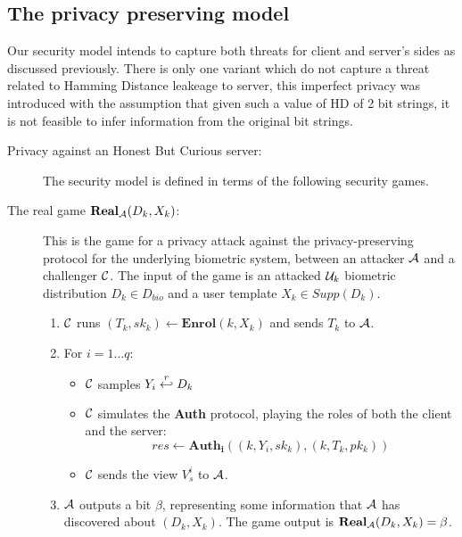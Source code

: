 \subsection{The privacy preserving model}
  Our security model intends to capture both threats for client and server's
  sides as discussed previously. There is only one variant which do not capture a
  threat related to Hamming Distance leakeage to server, this imperfect privacy
  was introduced with the assumption that given such a value of HD of 2 bit
  strings, it is not feasible to infer information from the original bit
  strings.
\begin{description}
\item[Privacy against an Honest But Curious server:] The security model is defined in terms of the following security games.

\item[The real game $\mathbf{Real}_{\mathcal{A}}(D_k,X_k)$:] This is the game for a privacy attack against the
  privacy-preserving protocol for the underlying biometric system, between an attacker $\mathcal{A}$ and a challenger
  $\mathcal{C}$. The input of the game is an attacked $\mathcal{U}_k$ biometric distribution $D_k \in D_{bio}$ and a user
  template $X_k \in Supp(D_k)$.
  \begin{enumerate} %
  \item $\mathcal{C}$ runs $(T_k, sk_k) \gets \mathbf{Enrol}(k,X_k)$ and sends $T_k$ to $\mathcal{A}$.
  \item For $i = 1 \dots q$:
    \begin{itemize}
    \item $\mathcal{C}$ samples \(Y_{i} \stackrel{r}{\hookleftarrow} D_{k}\)
    \item $\mathcal{C}$ simulates the \textbf{Auth} protocol, playing the roles of both the client and the server:
      \[
        res \gets \mathbf{Auth_i}((k, Y_i, sk_k), (k, T_k, pk_k))
      \]
    \item $\mathcal{C}$ sends the view $V_s^{i}$ to $\mathcal{A}$.
    \end{itemize}
  \item $\mathcal{A}$ outputs a bit $\beta$, representing some information that $\mathcal{A}$ has discovered about
    $(D_k,X_k)$. The game output is $\mathbf{Real}_{\mathcal{A}}(D_k,X_k) = \beta$.
  \end{enumerate}


\end{description}
